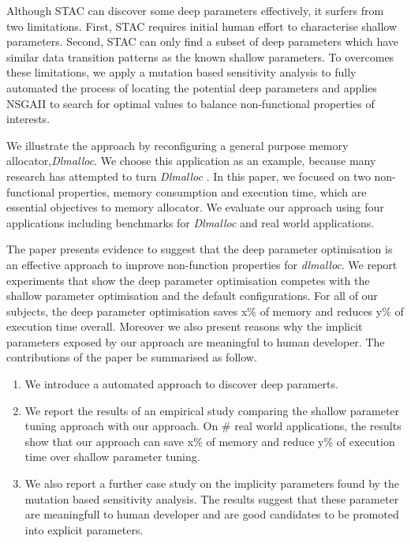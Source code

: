 Although STAC can discover some deep parameters effectively, it surfers from two limitations. First, STAC requires initial human effort to characterise shallow parameters. Second, STAC can only find a subset of deep parameters which have similar data transition patterns as the known shallow parameters. To overcomes these limitations, we apply a mutation based sensitivity analysis to fully automated the process of locating the potential deep parameters and applies NSGAII to search for  optimal values to balance non-functional properties of interests. 

We illustrate the approach by reconfiguring a general purpose memory allocator,\emph{Dlmalloc}. We choose this application as an example, because many research has attempted to turn \emph{Dlmalloc} \cite{Risco-Martin:2009:ODM:1569901.1570116,RiscoMartin2010572}. In this paper, we focused on two non-functional properties, memory consumption and execution time, which are essential objectives to memory allocator. We evaluate our approach using four applications including benchmarks for \emph{Dlmalloc} and real world applications.

The paper presents evidence to suggest that the deep parameter optimisation is an effective approach to improve non-function properties for \emph{dlmalloc}. 
We report experiments that show the deep parameter optimisation competes with the shallow parameter optimisation and the default configurations. For all of our subjects, the deep parameter optimisation saves x\% of memory and reduces y\% of execution time overall. Moreover we also present reasons why the implicit parameters exposed by our approach are meaningful to human developer. The contributions of the paper be summarised as follow.


\begin{enumerate}

\item We introduce a automated approach to discover deep paramerts. 

\item We report the results of an empirical study comparing the shallow parameter tuning approach with our approach. On \# real world applications, the results show that our approach can save x\% of memory and reduce y\% of execution time over shallow parameter tuning. 

\item We also report a further case study on the implicity parameters found by the mutation based sensitivity analysis. The results suggest that these parameter are meaningfull to human developer and are good candidates to be promoted into explicit parameters. 

\end{enumerate}



